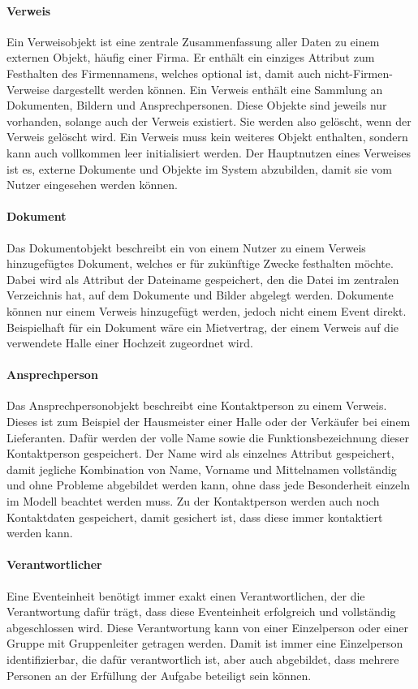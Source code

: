 \paragraph{Verweis}
Ein Verweisobjekt ist eine zentrale Zusammenfassung aller Daten zu einem externen Objekt, häufig einer Firma. Er enthält ein einziges Attribut zum Festhalten des Firmennamens, welches optional ist, damit auch nicht-Firmen-Verweise dargestellt werden können. Ein Verweis enthält eine Sammlung an Dokumenten, Bildern und Ansprechpersonen. Diese Objekte sind jeweils nur vorhanden, solange auch der Verweis existiert. Sie werden also gelöscht, wenn der Verweis gelöscht wird. Ein Verweis muss kein weiteres Objekt enthalten, sondern kann auch vollkommen leer initialisiert werden. Der Hauptnutzen eines Verweises ist es, externe Dokumente und Objekte im System abzubilden, damit sie vom Nutzer eingesehen werden können.
\paragraph{Dokument}
Das Dokumentobjekt beschreibt ein von einem Nutzer zu einem Verweis hinzugefügtes Dokument, welches er für zukünftige Zwecke festhalten möchte. Dabei wird als Attribut der Dateiname gespeichert, den die Datei im zentralen Verzeichnis hat, auf dem Dokumente und Bilder abgelegt werden. Dokumente können nur einem Verweis hinzugefügt werden, jedoch nicht einem Event direkt. Beispielhaft für ein Dokument wäre ein Mietvertrag, der einem Verweis auf die verwendete Halle einer Hochzeit zugeordnet wird.
\paragraph{Ansprechperson}
Das Ansprechpersonobjekt beschreibt eine Kontaktperson zu einem Verweis. Dieses ist zum Beispiel der Hausmeister einer Halle oder der Verkäufer bei einem Lieferanten. Dafür werden der volle Name sowie die Funktionsbezeichnung dieser Kontaktperson gespeichert. Der Name wird als einzelnes Attribut gespeichert, damit jegliche Kombination von Name, Vorname und Mittelnamen vollständig und ohne Probleme abgebildet werden kann, ohne dass jede Besonderheit einzeln im Modell beachtet werden muss. Zu der Kontaktperson werden auch noch Kontaktdaten gespeichert, damit gesichert ist, dass diese immer kontaktiert werden kann.

\paragraph{Verantwortlicher}
Eine Eventeinheit benötigt immer exakt einen Verantwortlichen, der die Verantwortung dafür trägt, dass diese Eventeinheit erfolgreich und vollständig abgeschlossen wird. Diese Verantwortung kann von einer Einzelperson oder einer Gruppe mit Gruppenleiter getragen werden. Damit ist immer eine Einzelperson identifizierbar, die dafür verantwortlich ist, aber auch abgebildet, dass mehrere Personen an der Erfüllung der Aufgabe beteiligt sein können.
